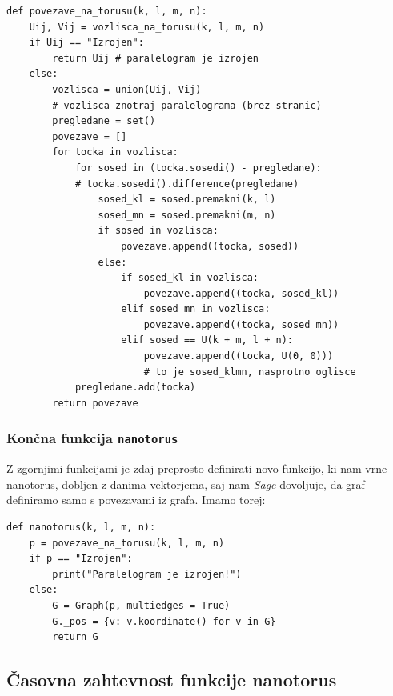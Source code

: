 \documentclass[a4paper, 10 pt, titlepage]{article}
\begin{document}
\begin{verbatim}
def povezave_na_torusu(k, l, m, n):
    Uij, Vij = vozlisca_na_torusu(k, l, m, n)
    if Uij == "Izrojen":
        return Uij # paralelogram je izrojen
    else:
        vozlisca = union(Uij, Vij) 
        # vozlisca znotraj paralelograma (brez stranic)
        pregledane = set()
        povezave = []
        for tocka in vozlisca:
            for sosed in (tocka.sosedi() - pregledane): 
            # tocka.sosedi().difference(pregledane)
                sosed_kl = sosed.premakni(k, l)
                sosed_mn = sosed.premakni(m, n)
                if sosed in vozlisca:
                    povezave.append((tocka, sosed))
                else:
                    if sosed_kl in vozlisca:
                        povezave.append((tocka, sosed_kl))
                    elif sosed_mn in vozlisca:
                        povezave.append((tocka, sosed_mn))
                    elif sosed == U(k + m, l + n):
                        povezave.append((tocka, U(0, 0))) 
                        # to je sosed_klmn, nasprotno oglisce
            pregledane.add(tocka)
        return povezave 
\end{verbatim}

\subsubsection{Končna funkcija \texttt{nanotorus}}

Z zgornjimi funkcijami je zdaj preprosto definirati novo funkcijo, ki nam vrne nanotorus, dobljen z danima vektorjema, saj nam \textit{Sage} dovoljuje, da graf definiramo samo s povezavami iz grafa.  Imamo torej:

\begin{verbatim}
def nanotorus(k, l, m, n):
    p = povezave_na_torusu(k, l, m, n)
    if p == "Izrojen":
        print("Paralelogram je izrojen!")
    else:
        G = Graph(p, multiedges = True)
        G._pos = {v: v.koordinate() for v in G}
        return G
\end{verbatim}

\subsection{Časovna zahtevnost funkcije nanotorus}
\end{document}
